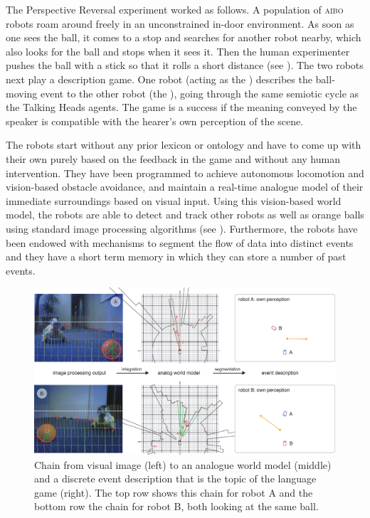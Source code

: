 \enlargethispage{1\baselineskip}
The Perspective Reversal experiment worked as follows. A population of \textsc{aibo} robots roam around
freely in an unconstrained in-door environment. As soon as one sees the
ball, it comes to a stop and searches for another robot nearby, which also
looks for the ball and stops when it sees it. Then the human
experimenter pushes the ball with a stick so that it rolls a short
distance (see ). The two robots next play a description game. One robot (acting as the ) 
describes the ball-moving event to the other robot (the ), going through the same semiotic cycle as the Talking 
Heads agents. The game is a success if the meaning conveyed by the speaker is compatible with the hearer's 
own perception of the scene. 

The robots start without any prior lexicon or ontology and have to come up with their own 
purely based on the feedback in the game and without any human intervention. 
They have been programmed to achieve autonomous locomotion and vision-based obstacle avoidance,
and maintain a real-time analogue model of their immediate surroundings based on visual input. Using
this vision-based world model, the robots are able to detect and track
other robots as well as orange balls using standard image processing
algorithms (see ). Furthermore, the
robots have been endowed with mechanisms to segment the flow of data
into distinct events and they have a short term memory in which they
can store a number of past events.

\begin{figure}[p]
  \centerline{\includegraphics[width=.90\textwidth]{chap10/figs/persp-rev-perception.pdf}}
\caption{\label{fig:persp-rev-perception}Chain from visual image (left) to an analogue world model (middle) and a discrete event description
that is the topic of the language game (right). 
The top row shows this chain for robot A and the bottom row the chain for robot B, both looking at the same ball.}
\end{figure}

